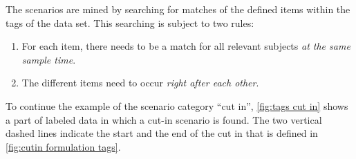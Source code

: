 The scenarios are mined by searching for matches of the defined items within the tags of the data set. 
This searching is subject to two rules:
\begin{enumerate}
	\item For each item, there needs to be a match for all relevant subjects \emph{at the same sample time}.
	\item The different items need to occur \emph{right after each other}. 
\end{enumerate}\cendb
\cstartd To continue the example of the scenario category ``cut in'', \cref{fig:tags cut in} shows a part of labeled data in which a cut-in scenario is found. \cendd
\cstartb The two vertical dashed lines indicate the start and the end of the cut in that is defined in \cref{fig:cutin formulation tags}.
\cendb

\begin{figure*}
	\centering
	
	\caption{\cstartc Example of tags describing a cut in. Note that only the tags that are relevant for the cut in, as defined in \cref{fig:cutin formulation tags}, are shown. \cendc\cstartf Furthermore, whereas there are multiple other vehicles around the ego vehicle, only the other vehicle that performs the cut in is shown.\cendf}
	\label{fig:tags cut in}
\end{figure*}



